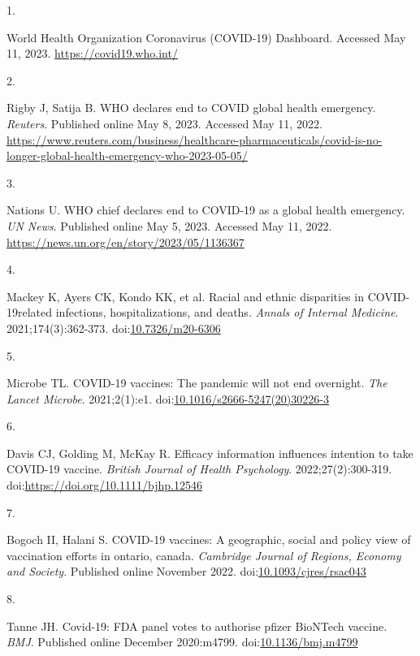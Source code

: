 \documentclass[
]{article}
\newlength{\cslhangindent}
\newlength{\csllabelwidth}
\newlength{\cslentryspacingunit} %
\newenvironment{CSLReferences}[2] %
 {%
  \setlength{\parindent}{0pt}
  \ifodd #1
  \let\oldpar\par
  \def\par{\hangindent=\cslhangindent\oldpar}
  \fi
  \setlength{\parskip}{#2\cslentryspacingunit}
 }%
 {}
\newcommand{\CSLLeftMargin}[1]{\parbox[t]{\csllabelwidth}{#1}}
\newcommand{\CSLRightInline}[1]{\parbox[t]{\linewidth - \csllabelwidth}{#1}\break}
\begin{document}
\hypertarget{refs}{}
\begin{CSLReferences}{0}{0}
\leavevmode{}%
\CSLLeftMargin{1. }%
\CSLRightInline{{World Health Organization Coronavirus (COVID-19)
Dashboard}. Accessed May 11, 2023. \url{https://covid19.who.int/}}

\leavevmode{}%
\CSLLeftMargin{2. }%
\CSLRightInline{Rigby J, Satija B. {WHO} declares end to COVID global
health emergency. \emph{Reuters}. Published online May 8, 2023. Accessed
May 11, 2022.
\url{https://www.reuters.com/business/healthcare-pharmaceuticals/covid-is-no-longer-global-health-emergency-who-2023-05-05/}}

\leavevmode{}%
\CSLLeftMargin{3. }%
\CSLRightInline{Nations U. {WHO} chief declares end to COVID-19 as a
global health emergency. \emph{UN News}. Published online May 5, 2023.
Accessed May 11, 2022.
\url{https://news.un.org/en/story/2023/05/1136367}}

\leavevmode{}%
\CSLLeftMargin{4. }%
\CSLRightInline{Mackey K, Ayers CK, Kondo KK, et al. Racial and ethnic
disparities in {COVID}-19{\textendash}related infections,
hospitalizations, and deaths. \emph{Annals of Internal Medicine}.
2021;174(3):362-373.
doi:\href{https://doi.org/10.7326/m20-6306}{10.7326/m20-6306}}

\leavevmode{}%
\CSLLeftMargin{5. }%
\CSLRightInline{Microbe TL. {COVID}-19 vaccines: The pandemic will not
end overnight. \emph{The Lancet Microbe}. 2021;2(1):e1.
doi:\href{https://doi.org/10.1016/s2666-5247(20)30226-3}{10.1016/s2666-5247(20)30226-3}}

\leavevmode{}%
\CSLLeftMargin{6. }%
\CSLRightInline{Davis CJ, Golding M, McKay R. Efficacy information
influences intention to take COVID-19 vaccine. \emph{British Journal of
Health Psychology}. 2022;27(2):300-319.
doi:\url{https://doi.org/10.1111/bjhp.12546}}

\leavevmode{}%
\CSLLeftMargin{7. }%
\CSLRightInline{Bogoch II, Halani S. {COVID}-19 vaccines: A geographic,
social and policy view of vaccination efforts in ontario, canada.
\emph{Cambridge Journal of Regions, Economy and Society}. Published
online November 2022.
doi:\href{https://doi.org/10.1093/cjres/rsac043}{10.1093/cjres/rsac043}}

\leavevmode{}%
\CSLLeftMargin{8. }%
\CSLRightInline{Tanne JH. Covid-19: {FDA} panel votes to authorise
pfizer {BioNTech} vaccine. \emph{{BMJ}}. Published online December
2020:m4799.
doi:\href{https://doi.org/10.1136/bmj.m4799}{10.1136/bmj.m4799}}


\end{CSLReferences}
\end{document}
